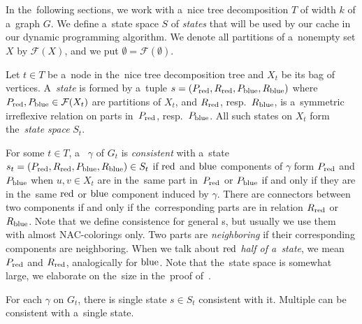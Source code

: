 In the~following sections,
we work with a~nice tree decomposition \( T \) of width \( k \)
of a~graph \( G \).
%
We define a~state space \( S \) of \emph{states}
that will be used by our cache in our dynamic programming algorithm.
We denote all partitions of a~nonempty set \( X \) by \( \mathcal{F}(X) \),
and we put \( \emptyset = \mathcal{F}(\emptyset) \).

%
\begin{definition}
	Let \( t \in T \) be a~node in the~nice tree decomposition tree and
	\( X_t \) be its bag of vertices.
	A~\emph{state} is formed by a~tuple \( s = (P_{\text{red}}, R_{\text{red}}, P_{\text{blue}}, R_{\text{blue}}) \)
	where \( P_{\text{red}}, P_{\text{blue}} \in \mathcal{F}(X_t)\) are partitions of \( X_t \),
	and \( R_{\text{red}}\), resp.\ \(R_{\text{blue}} \), is a~symmetric irreflexive relation
	on parts in~\( P_{\text{red}}\), resp.\ \(P_{\text{blue}} \).
	All such states on \( X_t \) form the~\emph{state space} \( S_t \).
\end{definition}
%
For some \( t \in T \), a~\rbcol{} \( \gamma \) of \( G_t \)
is \emph{consistent} with a~state \( s_t = (P_{\text{red}}, R_{\text{red}}, P_{\text{blue}}, R_{\text{blue}}) \in S_t \)
if \( \text{red} \) and \( \text{blue} \) components of \( \gamma \) form \( P_{\text{red}} \) and \( P_{\text{blue}} \)
when \( u, v \in X_t \) are in the~same part in~\( P_{\text{red}} \) or \( P_{\text{blue}} \)
if and only if they are in the~same \( \text{red} \) or \( \text{blue} \) component induced by \( \gamma \).
There are connectors between two components if and only if
the~corresponding parts are in relation \( R_{\text{red}} \) or \( R_{\text{blue}} \).
%
Note that we define consistence for general \rbcol{}s,
but usually we use them with almost NAC-colorings only.
%
Two parts are \emph{neighboring} if their corresponding components are neighboring.
When we talk about \emph{\( \text{red} \) half of a~state},
we mean \( P_{\text{red}} \) and \( R_{\text{red}} \),
analogically for \( \text{blue} \).
%
Note that the~state space is somewhat large,
we elaborate on the~size in the~proof of~.
%
\begin{observation}
	For each \rbcol{} \( \gamma \) on \( G_t \),
	there is single state \( s \in S_t \) consistent with it.
	Multiple \rbcol{} can be consistent with a~single state.
\end{observation}
%

